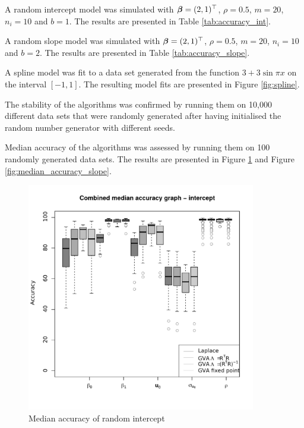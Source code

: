 \documentclass{article}[12pt]
\begin{document}
A random intercept model was simulated with ${\boldsymbol \beta} = (2, 1)^\top$, $\rho = 0.5$, $m = 20$, $n_i = 10$ and $b
= 1$. The results are presented in Table \ref{tab:accuracy_int}.

A random slope model was simulated with ${\boldsymbol \beta} = (2, 1)^\top$, $\rho = 0.5$, $m = 20$, $n_i = 10$ and $b =
2$. The results are presented in Table \ref{tab:accuracy_slope}.

A spline model was fit to a data set generated from the function $3 + 3 \sin{\pi x}$ on the interval $[-1,
1]$. The resulting model fits are presented in Figure \ref{fig:spline}.

The stability of the algorithms was confirmed by running them on 10,000 different data sets that were randomly
generated after having initialised the random number generator with different seeds.

Median accuracy of the algorithms was assessed by running them on 100 randomly generated data sets. The
results are presented in Figure \ref{fig:median_accuracy_intercept} and Figure
\ref{fig:median_accuracy_slope}.

\begin{figure}
\caption{Median accuracy of random intercept}
\label{fig:median_accuracy_intercept}
\includegraphics[width=100mm, height=100mm]{code/results/median_accuracy_combined_intercept.pdf}
\end{figure}
\end{document}

